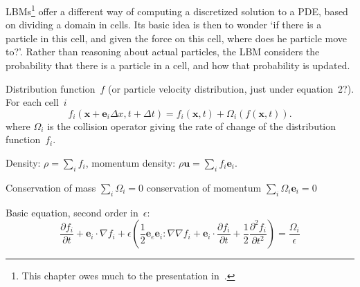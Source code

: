 \acfp{LBM}\footnote{This chapter owes much to the presentation
  in~\cite{ChenDoolen:LBM}.}  offer a different way of computing a
discretized solution to a \ac{PDE}, based on dividing a domain in
cells. Its basic idea is then to wonder `if there is a particle in
this cell, and given the force on this cell, where does he particle
move to?'. Rather than reasoning about actual particles, the \ac{LBM}
considers the probability that there is a particle in a cell, and how
that probability is updated.

Distribution function~$f$ (or particle velocity distribution, just
under equation~2?).  For each cell~$i$
\[ f_i(\mathbf{x}+\mathbf{e}_i\Delta x,t+\Delta t) 
    = f_i(\mathbf{x},t)+\Omega_i(f(\mathbf{x},t)).
\]
where $\Omega_i$ is the collision operator giving
the rate of change of the distribution function~$f_i$.

Density: $\rho=\sum_i f_i$,
momentum density: $\rho\mathbf{u}=\sum_if_i\mathbf{e}_i$.

Conservation of mass $\sum_i\Omega_i=0$
conservation of momentum $\sum_i\Omega_i\mathbf{e}_i=0$


Basic equation, second order in~$\epsilon$:
\[
  \frac{\partial f_i}{\partial t} + \mathbf{e}_i\cdot \nabla f_i +
  \epsilon\left(
    \frac12 \mathbf{e}_e\mathbf{e}_i\colon \nabla\nabla f_i +
    \mathbf{e}_i\cdot\frac{\partial f_i}{\partial t} +
    \frac12 \frac{\partial^2f_i}{\partial t^2}
  \right) = \frac{\Omega_i}{\epsilon}
\]
